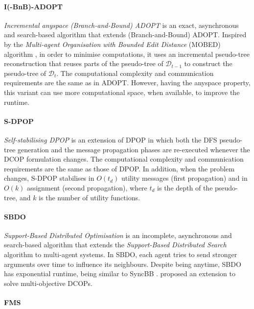 \paragraph{I(-BnB)-ADOPT}

\emph{Incremental anyspace (Branch-and-Bound) ADOPT} \cite{yeoh2015} is an exact,
asynchronous and search-based algorithm that extends (Branch-and-Bound) ADOPT. Inspired by
the \emph{Multi-agent Organisation with Bounded Edit Distance} (MOBED) algorithm
\cite{sultanik2009}, in order to minimise computations, it uses an incremental pseudo-tree
reconstruction that reuses parts of the pseudo-tree of $\mathcal{D}_{t - 1}$ to construct
the pseudo-tree of $\mathcal{D}_t$. The computational complexity and communication
requirements are the same as in ADOPT. However, having the anyspace property, this variant
can use more computational space, when available, to improve the runtime.

\paragraph{S-DPOP}

\emph{Self-stabilising DPOP} \cite{petcu2005b} is an extension of DPOP in which both the
DFS pseudo-tree generation and the message propagation phases are re-executed whenever the
DCOP formulation changes. The computational complexity and communication requirements are
the same as those of DPOP. In addition, when the problem changes, S-DPOP stabilises in
$O(t_d)$ utility messages (first propagation) and in $O(k)$ assignment (second
propagation), where $t_d$ is the depth of the pseudo-tree, and $k$ is the number of
utility functions.

\paragraph{SBDO}

\emph{Support-Based Distributed Optimisation} \cite{billiau2012} is an incomplete,
asynchronous and search-based algorithm that extends the \emph{Support-Based Distributed
Search} algorithm \cite{harvey2006} to multi-agent systems. In SBDO, each
agent tries to send stronger arguments over time to influence its neighbours. Despite
being anytime, SBDO has exponential runtime, being similar to SyncBB \cite{hirayama1997}.
\cite{billiau2014} proposed an extension to solve multi-objective DCOPs.

\paragraph{FMS}\label{sec:lit-fms}

